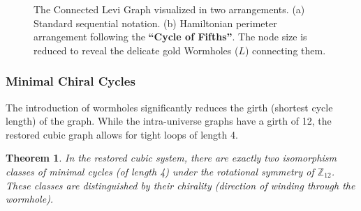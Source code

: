 \documentclass[12pt,letterpaper]{amsart}
\newtheorem{theorem}{Theorem}
\begin{document}
\begin{figure}[H]
\begin{minipage}{0.48\textwidth}
    \end{minipage}
    
    \caption{The Connected Levi Graph visualized in two arrangements. (a) Standard sequential notation. (b) Hamiltonian perimeter arrangement following the \textbf{``Cycle of Fifths''}. The node size is reduced to reveal the delicate gold Wormholes (\texorpdfstring{$L$}{L}) connecting them.}
    \label{fig:levi_circular_delta3}
\end{figure}


\subsubsection{Minimal Chiral Cycles}%
The introduction of wormholes significantly reduces the girth (shortest cycle length) of the graph. While the intra-universe graphs have a girth of 12, the restored cubic graph allows for tight loops of length 4.

\begin{theorem}
In the restored cubic system, there are exactly two isomorphism classes of minimal cycles (of length 4) under the rotational symmetry of \texorpdfstring{$\mathbb{Z}_{12}$}{Z12}. These classes are distinguished by their chirality (direction of winding through the wormhole).
\end{theorem}
\end{document}
